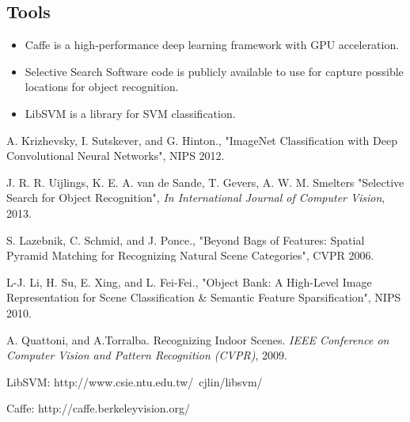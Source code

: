 \documentclass[letterpaper,twocolumn,11pt]{article}
\begin{document}
	\subsection{Tools}
	\begin{itemize}
	\item{Caffe} is a high-performance deep learning framework with GPU
	acceleration. \cite{CAFFE}

	\item{Selective Search Software} code is publicly available to use
	for capture possible locations for object recognition. \cite{SS}

	\item{LibSVM} is a library for SVM classification. \cite{SVM}
	\end{itemize}

\begin{thebibliography}{10}

 A. Krizhevsky, I. Sutskever, and G. Hinton.,
"ImageNet Classification with Deep Convolutional Neural Networks",
NIPS 2012.

 J. R. R. Uijlings, K. E. A. van de Sande,
T. Gevers, A. W. M. Smelters
"Selective Search for Object Recognition",
\emph{In International Journal of Computer Vision}, 2013.

 S. Lazebnik, C. Schmid, and J. Ponce.,
"Beyond Bags of Features:
Spatial Pyramid Matching for Recognizing Natural Scene Categories",
CVPR 2006.

 L-J. Li, H. Su, E. Xing, and L. Fei-Fei.,
"Object Bank: A High-Level Image Representation for Scene Classification
\& Semantic Feature Sparsification",
NIPS 2010.

 A. Quattoni, and A.Torralba. Recognizing Indoor Scenes.
\emph{IEEE Conference on Computer Vision and Pattern Recognition (CVPR)},
2009.

 LibSVM: http://www.csie.ntu.edu.tw/~cjlin/libsvm/

 Caffe: http://caffe.berkeleyvision.org/


\end{thebibliography}
\end{document}
